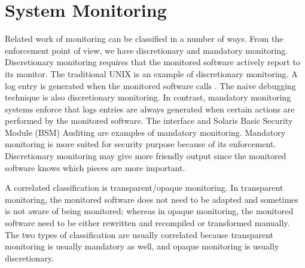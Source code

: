\section{System Monitoring}
\label{sec:bg-mon}

Related work of monitoring can be classified in a number of ways.
From the enforcement point of view, we have discretionary and
mandatory monitoring.
Discretionary monitoring requires that the monitored software
actively report to its monitor.
The traditional UNIX  is an example of discretionary monitoring.
A log entry is generated when the monitored software calls .
The naive  debugging technique is also discretionary monitoring.
In contrast, mandatory monitoring systems enforce that logs entries are always
generated when certain actions are performed by the monitored software.
The  interface and Solaris Basic Security Module (BSM) Auditing
are examples of mandatory monitoring.
Mandatory monitoring is more suited for security purpose because of its enforcement.
Discretionary monitoring may give more friendly output since the monitored
software knows which pieces are more important.

A correlated classification is transparent/opaque monitoring.
In transparent monitoring, the monitored software does not need to be adapted
and sometimes is not aware of being monitored;
whereas in opaque monitoring, the monitored software need to be either
rewritten and recompiled or transformed manually.
The two types of classification are usually correlated because transparent monitoring
is usually mandatory as well, and opaque monitoring is usually discretionary.

